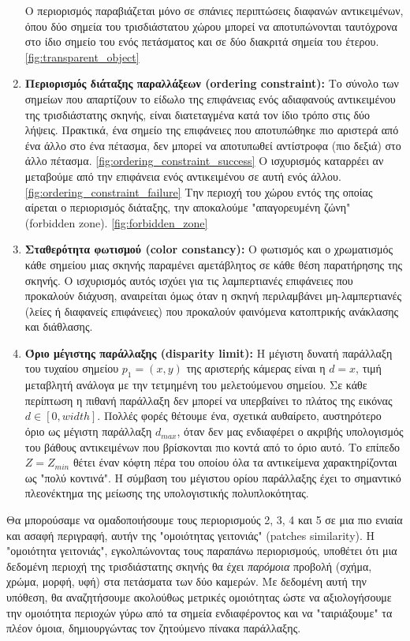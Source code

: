 \begin{enumerate}[label=\textbf{\arabic*.}, ref={\arabic*}]
	Ο περιορισμός παραβιάζεται μόνο σε σπάνιες περιπτώσεις διαφανών αντικειμένων, όπου δύο σημεία του τρισδιάστατου χώρου μπορεί να αποτυπώνονται ταυτόχρονα στο ίδιο σημείο του ενός πετάσματος και σε δύο διακριτά σημεία του έτερου. \ref{fig:transparent_object}
	\item \label{prop:ordering_contraint} \textbf{Περιορισμός διάταξης παραλλάξεων \e (ordering constraint):} \g Το σύνολο των σημείων που απαρτίζουν το είδωλο της επιφάνειας ενός αδιαφανούς αντικειμένου της τρισδιάστατης σκηνής, είναι διατεταγμένα κατά τον ίδιο τρόπο στις δύο λήψεις. Πρακτικά, ένα σημείο της επιφάνειες που αποτυπώθηκε πιο αριστερά από ένα άλλο στο ένα πέτασμα, δεν μπορεί να αποτυπωθεί αντίστροφα (πιο δεξιά) στο άλλο πέτασμα. \ref{fig:ordering_constraint_success} Ο ισχυρισμός καταρρέει αν μεταβούμε από την επιφάνεια ενός αντικειμένου σε αυτή ενός άλλου. \ref{fig:ordering_constraint_failure} Την περιοχή του χώρου εντός της οποίας αίρεται ο περιορισμός διάταξης, την αποκαλούμε "απαγορευμένη ζώνη" \e (forbidden zone). \g \ref{fig:forbidden_zone}
	\item \label{prop:stereo_constancy} \textbf{Σταθερότητα φωτισμού \e (color constancy):} \g Ο φωτισμός και ο χρωματισμός κάθε σημείου μιας σκηνής παραμένει αμετάβλητος σε κάθε θέση παρατήρησης της σκηνής. Ο ισχυρισμός αυτός ισχύει για τις λαμπερτιανές επιφάνειες που προκαλούν διάχυση, αναιρείται όμως όταν η σκηνή περιλαμβάνει μη-λαμπερτιανές (λείες ή διαφανείς επιφάνειες) που προκαλούν φαινόμενα κατοπτρικής ανάκλασης και διάθλασης.
	\item \label{prop:disparity_limit} \textbf{Όριο μέγιστης παράλλαξης \e (disparity limit):} \g Η μέγιστη δυνατή παράλλαξη του τυχαίου σημείου $p_1 = (x,y)$ της αριστερής κάμερας είναι η $d = x$, τιμή μεταβλητή ανάλογα με την τετμημένη του μελετούμενου σημείου. Σε κάθε περίπτωση η πιθανή παράλλαξη δεν μπορεί να υπερβαίνει το πλάτος της εικόνας $d \in [0,width]$. Πολλές φορές θέτουμε ένα, σχετικά αυθαίρετο, αυστηρότερο όριο ως μέγιστη παράλλαξη $d_{max}$, όταν δεν μας ενδιαφέρει ο ακριβής υπολογισμός του βάθους αντικειμένων που βρίσκονται πιο κοντά από το όριο αυτό. Το επίπεδο $Z = Z_{min}$ θέτει έναν κόφτη πέρα του οποίου όλα τα αντικείμενα χαρακτηρίζονται ως "πολύ κοντινά". Η σύμβαση του μέγιστου ορίου παράλλαξης έχει το σημαντικό πλεονέκτημα της μείωσης της υπολογιστικής πολυπλοκότητας.
\end{enumerate}

Θα μπορούσαμε να ομαδοποιήσουμε τους περιορισμούς 2, 3, 4 και 5 σε μια πιο ενιαία και ασαφή περιγραφή, αυτήν της "ομοιότητας γειτονιάς" \e(patches similarity). \label{prop:patches_similarity} \g Η "ομοιότητα γειτονιάς", εγκολπώνοντας τους παραπάνω περιορισμούς, υποθέτει ότι μια δεδομένη περιοχή της τρισδιάστατης σκηνής θα έχει \textit{παρόμοια} προβολή (σχήμα, χρώμα, μορφή, υφή) στα πετάσματα των δύο καμερών. Με δεδομένη αυτή την υπόθεση, θα αναζητήσουμε ακολούθως μετρικές ομοιότητας ώστε να αξιολογήσουμε την ομοιότητα περιοχών γύρω από τα σημεία ενδιαφέροντος και να "ταιριάξουμε" τα πλέον όμοια, δημιουργώντας τον ζητούμενο πίνακα παράλλαξης.

